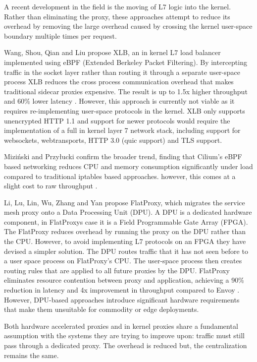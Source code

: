\documentclass[a4paper,11pt]{article}
\begin{document}
A recent development in the field is the moving of L7 logic into the
kernel. Rather than eliminating the proxy, these approaches attempt to reduce its
overhead by removing the large overhead caused by crossing the kernel user-space boundary
multiple times per request.

Wang, Shou, Qian and Liu propose XLB, an in kernel L7 load balancer implemented using
eBPF (Extended Berkeley Packet Filtering). By intercepting traffic in the socket layer
rather than routing it through a separate user-space process XLB reduces the cross process
communication overhead that makes traditional sidecar proxies expensive. The result
is up to 1.5x higher throughput and 60\% lower latency \cite{wangXLBHighPerformance2026}.
However, this approach is currently not viable as it requires re-implementing user-space protocols in
the kernel. XLB only supports unencrypted HTTP 1.1 and support for newer protocols would require the implementation
of a full in kernel layer 7 network stack, including support for websockets, webtransports, HTTP 3.0 (quic support) and TLS support.

Miziński and Przyłucki confirm the broader trend, finding that Cilium's eBPF based networking
reduces CPU and memory consumption significantly under load compared to traditional iptables based approaches.
however, this comes at a slight cost to raw throughput \cite{mizinskiImpactUsingEBPF2025}.

Li, Lu, Lin, Wu, Zhang and Yan propose FlatProxy, which migrates the service mesh proxy onto
a Data Processing Unit (DPU). A DPU is a dedicated hardware component, in FlatProxys case it is a Field Programmable Gate Array (FPGA).
The FlatProxy reduces overhead by running the proxy on the DPU rather than the CPU. However, to avoid implementing L7 protocols on an FPGA
they have devised a simpler solution. The DPU routes traffic that it has not seen before to a user space process on FlatProxy's CPU.
The user-space process then creates routing rules that are applied to all future proxies by the DPU. FlatProxy eliminates resource contention between proxy and application, 
achieving a 90\% reduction in latency and 4x improvement in throughput compared to Envoy \cite{liFlatProxyDPUcentricService2023}. 
However, DPU-based approaches introduce significant hardware requirements that make them unsuitable for commodity or edge deployments.

Both hardware accelerated proxies and in kernel proxies share a fundamental assumption with the systems they are trying to improve upon:
traffic must still pass through a dedicated proxy. The overhead is reduced but, the centralization remains the same.
\end{document}
